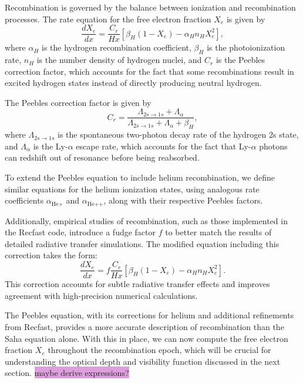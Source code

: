 \documentclass{aa}
\begin{document}
Recombination is governed by the balance between ionization and recombination processes. The rate equation for the free electron fraction $X_e$ is given by
\begin{equation}
\frac{dX_e}{dx} = \frac{C_r}{H x} \left[ \beta_H (1 - X_e) - \alpha_H n_H X_e^2 \right],
\end{equation}
where $\alpha_H$ is the hydrogen recombination coefficient, $\beta_H$ is the photoionization rate, $n_H$ is the number density of hydrogen nuclei,
and $C_r$ is the Peebles correction factor, which accounts for the fact that some recombinations result in excited hydrogen states instead of directly producing neutral hydrogen.

The Peebles correction factor is given by
\begin{equation}
C_r = \frac{\Lambda_{2s \to 1s} + \Lambda_{\alpha}}{\Lambda_{2s \to 1s} + \Lambda_{\alpha} + \beta_H},
\end{equation}
where $\Lambda_{2s \to 1s}$ is the spontaneous two-photon decay rate of the hydrogen 2s state, and $\Lambda_{\alpha}$ is the Ly-$\alpha$ escape rate, which accounts for the fact that Ly-$\alpha$ photons can redshift out of resonance before being reabsorbed.

To extend the Peebles equation to include helium recombination, we define similar equations for the helium ionization states, using analogous rate coefficients $\alpha_{\text{He+}}$ and $\alpha_{\text{He++}}$, along with their respective Peebles factors.

Additionally, empirical studies of recombination, such as those implemented in the Recfast code, introduce a fudge factor $f$ to better match the results of detailed radiative transfer simulations. The modified equation including this correction takes the form:
\begin{equation}
\frac{dX_e}{dx} = f \frac{C_r}{H x} \left[ \beta_H (1 - X_e) - \alpha_H n_H X_e^2 \right].
\end{equation}
This correction accounts for subtle radiative transfer effects and improves agreement with high-precision numerical calculations.

The Peebles equation, with its corrections for helium and additional refinements from Recfast, provides a more accurate description of recombination than the Saha equation alone. With this in place, we can now compute the free electron fraction $X_e$ throughout the recombination epoch, which will be crucial for understanding the optical depth and visibility function discussed in the next section.
\color{black}
\colorbox{Plum}{maybe derive expressions?}
\end{document}
